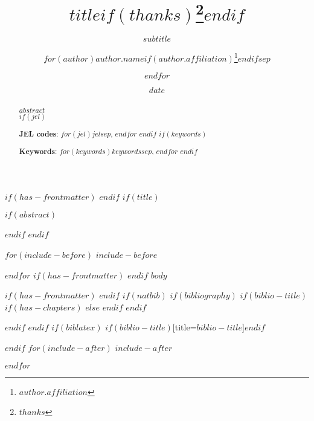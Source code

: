 \documentclass[
  11pt,
$if(lang)$
  $babel-lang$,
$endif$
a4paper
$for(classoption)$
  $classoption$$sep$,
$endfor$
]{article}
\title{$title$$if(thanks)$\thanks{$thanks$}$endif$}
\subtitle{$subtitle$}
\author{
  $for(author)$$author.name$$if(author.affiliation)$\thanks{
    $author.affiliation$
  }$endif$$sep$ \and
  $endfor$
}
\date{$date$}
\begin{document}
$if(has-frontmatter)$
\frontmatter
$endif$
$if(title)$
\maketitle
\thispagestyle{empty} %
$if(abstract)$
\begin{abstract}
  \noindent $abstract$\\
  $if(jel)$

  \noindent \textbf{JEL codes}: $for(jel)$$jel$$sep$, $endfor$
  $endif$
  $if(keywords)$

  \noindent \textbf{Keywords}: $for(keywords)$$keywords$$sep$, $endfor$
  $endif$
\end{abstract}
\restoregeometry
$endif$
$endif$

\tableofcontents
\listoffigures
\listoftables
\newpage

$for(include-before)$
$include-before$

$endfor$
$if(has-frontmatter)$
\mainmatter
$endif$
$body$

$if(has-frontmatter)$
\backmatter
$endif$
$if(natbib)$
$if(bibliography)$
$if(biblio-title)$
$if(has-chapters)$
\renewcommand\bibname{$biblio-title$}
$else$
\renewcommand\refname{$biblio-title$}
$endif$
$endif$
  

$endif$
$endif$
$if(biblatex)$
\printbibliography$if(biblio-title)$[title=$biblio-title$]$endif$

$endif$
$for(include-after)$
$include-after$

$endfor$
\end{document}
